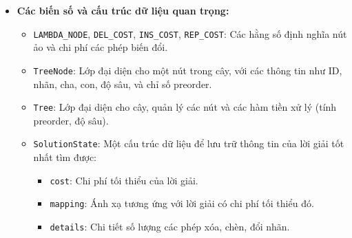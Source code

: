 \documentclass{article}
\begin{document}
\begin{itemize}
    \item \textbf{Các biến số và cấu trúc dữ liệu quan trọng:}
    \begin{itemize}
        \item \texttt{LAMBDA\_NODE}, \texttt{DEL\_COST}, \texttt{INS\_COST}, \texttt{REP\_COST}: Các hằng số định nghĩa nút ảo và chi phí các phép biến đổi.
        \item \texttt{TreeNode}: Lớp đại diện cho một nút trong cây, với các thông tin như ID, nhãn, cha, con, độ sâu, và chỉ số preorder.
        \item \texttt{Tree}: Lớp đại diện cho cây, quản lý các nút và các hàm tiền xử lý (tính preorder, độ sâu).
        \item \texttt{SolutionState}: Một cấu trúc dữ liệu để lưu trữ thông tin của lời giải tốt nhất tìm được:
            \begin{itemize}
                \item \texttt{cost}: Chi phí tối thiểu của lời giải.
                \item \texttt{mapping}: Ánh xạ tương ứng với lời giải có chi phí tối thiểu đó.
                \item \texttt{details}: Chi tiết số lượng các phép xóa, chèn, đổi nhãn.
            \end{itemize}
    \end{itemize}


\end{itemize}
\end{document}
